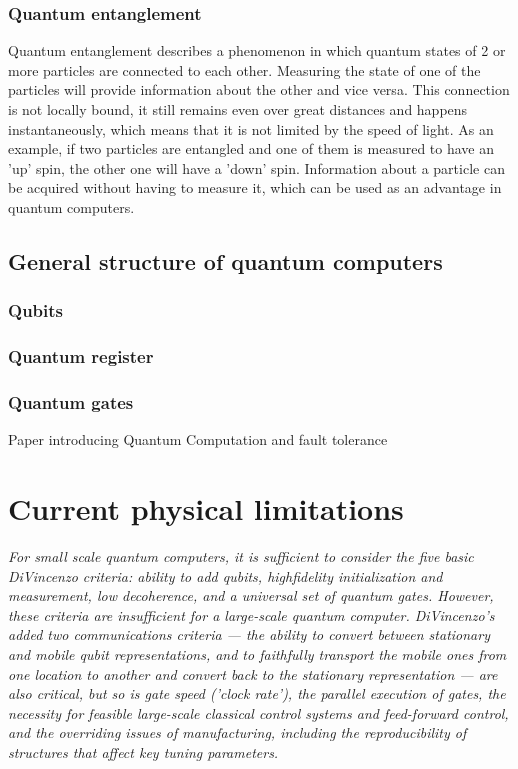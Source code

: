 \subsubsection{Quantum entanglement}
Quantum entanglement describes a phenomenon in which quantum states of 2 or more particles are connected to each other. Measuring the state of one of the particles will provide information about the other and vice versa. This connection is not locally bound, it still remains even over great distances and happens instantaneously, which means that it is not limited by the speed of light. As an example, if two particles are entangled and one of them is measured to have an 'up' spin, the other one will have a 'down' spin. Information about a particle can be acquired without having to measure it, which can be used as an advantage in quantum computers.
\newpage
\subsection{General structure of quantum computers}
\subsubsection{Qubits}
\subsubsection{Quantum register}
\subsubsection{Quantum gates}
Paper introducing Quantum Computation and fault tolerance \cite{2015arXiv150803695P}
\section{Current physical limitations}

\textit{For small scale quantum computers, it is sufficient to consider the five basic DiVincenzo criteria: ability to add qubits, highfidelity initialization and measurement, low decoherence, and a universal set of quantum gates. However, these criteria are insufficient for a large-scale quantum computer. DiVincenzo’s added two communications criteria — the ability to convert between stationary and mobile qubit representations, and to faithfully transport the mobile ones from one location to another and convert back to the stationary representation — are also critical, but so is gate speed ('clock rate'), the parallel execution of gates, the necessity for feasible large-scale classical control systems and feed-forward control, and the overriding issues of manufacturing, including the reproducibility of structures that affect key tuning parameters.} \cite{2009arXiv0906.2686V}

